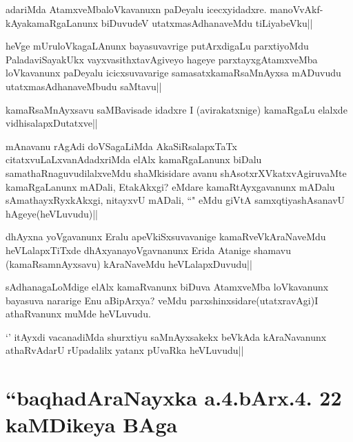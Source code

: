 \begin{artha}
adariMda AtamxveMbaloVkavanuxn paDeyalu icecxyidadxre. manoVvAkf-kAyakamaRgaLanunx biDuvudeV utatxmasAdhanaveMdu tiLiyabeVku||
\end{artha}

\begin{artha}
heVge mUruloVkagaLAnunx bayasuvavrige putArxdigaLu parxtiyoMdu PaladaviSayakUkx vayxvasithxtavAgiveyo hageye parxtayxgAtamxveMba loVkavanunx paDeyalu icicxsuvavarige samasatxkamaRsaMnAyxsa mADuvudu utatxmasAdhanaveMbudu saMtavu||
\end{artha}

\begin{artha}
kamaRsaMnAyxsavu saMBavisade idadxre I (avirakatxnige) kamaRgaLu elalxde vidhisalapxDutatxve||
\end{artha}

\begin{artha}
mAnavanu rAgAdi doVSagaLiMda AkaSiRsalapxTaTx citatxvuLaLxvanAdadxriMda elAlx kamaRgaLanunx biDalu samathaRnaguvudilalxveMdu shaMkisidare avanu shAsotxrXVkatxvAgiruvaMte kamaRgaLanunx mADali, EtakAkxgi? eMdare kamaRtAyxgavanunx mADalu sAmathayxRyxkAkxgi, nitayxvU mADali, ``\stext" eMdu giVtA samxqtiyashAsanavU hAgeye(heVLuvudu)||
\end{artha}

\begin{artha}
dhAyxna yoVgavanunx Eralu apeVkiSxsuvavanige kamaRveVkAraNaveMdu heVLalapxTiTxde dhAxyanayoVgavnanunx Erida Atanige shamavu (kamaRsamnAyxsavu) kAraNaveMdu heVLalapxDuvudu||
\end{artha}


\begin{artha}
sAdhanagaLoMdige elAlx kamaRvanunx biDuva AtamxveMba loVkavanunx bayasuva nararige Enu aBipArxya? veMdu parxshinxsidare(utatxravAgi)I athaRvanunx muMde heVLuvudu.
\end{artha}

\begin{artha}
`\stext' itAyxdi vacanadiMda shurxtiyu saMnAyxsakekx beVkAda kAraNavanunx athaRvAdarU rUpadalilx yatanx pUvaRka heVLuvudu||
\end{artha}

\section*{``baqhadAraNayxka a.4.bArx.4. 22 kaMDikeya BAga}

